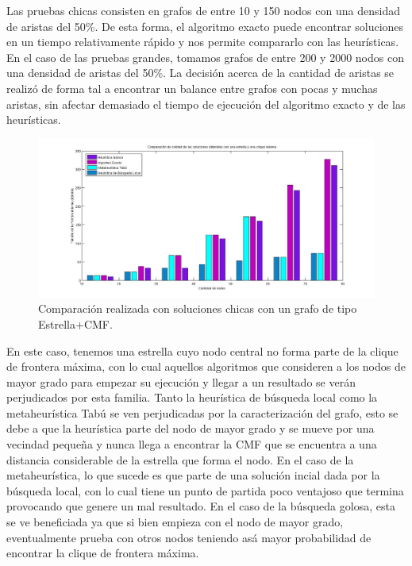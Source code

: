 Las pruebas chicas consisten en grafos de entre 10 y 150 nodos con una densidad de aristas del 50\%. De esta forma, el algoritmo exacto puede encontrar soluciones en un tiempo relativamente rápido y nos permite compararlo con las heurísticas. En el caso de las pruebas grandes, tomamos grafos de entre 200 y 2000 nodos con una densidad de aristas del 50\%. La decisión acerca de la cantidad de aristas se realizó de forma tal a encontrar un balance entre grafos con pocas y muchas aristas, sin afectar demasiado el tiempo de ejecución del algoritmo exacto y de las heurísticas. 


 \begin{figure}[H] %
\begin{center}
\includegraphics[width=400pt]{../imgs/calidadSolucionesChicas15.jpg}
\caption{Comparación realizada con soluciones chicas con un grafo de tipo Estrella+CMF.}
\end{center}
\end{figure}

En este caso, tenemos una estrella cuyo nodo central no forma parte de la clique de frontera máxima, con lo cual aquellos algoritmos que consideren a los nodos de mayor grado para empezar su ejecución y llegar a un resultado se verán perjudicados por esta familia. Tanto la heurística de búsqueda local como la metaheurística Tabú se ven perjudicadas por la caracterización del grafo, esto se debe a que la heurística parte del nodo de mayor grado y se mueve por una vecindad pequeña y nunca llega a encontrar la CMF que se encuentra a una distancia considerable de la estrella que forma el nodo. En el caso de la metaheurística, lo que sucede es que parte de una solución incial dada por la búsqueda local, con lo cual tiene un punto de partida poco ventajoso que termina provocando que genere un mal resultado. En el caso de la búsqueda golosa, esta se ve beneficiada ya que si bien empieza con el nodo de mayor grado, eventualmente prueba con otros nodos teniendo asá mayor probabilidad de encontrar la clique de frontera máxima. 

